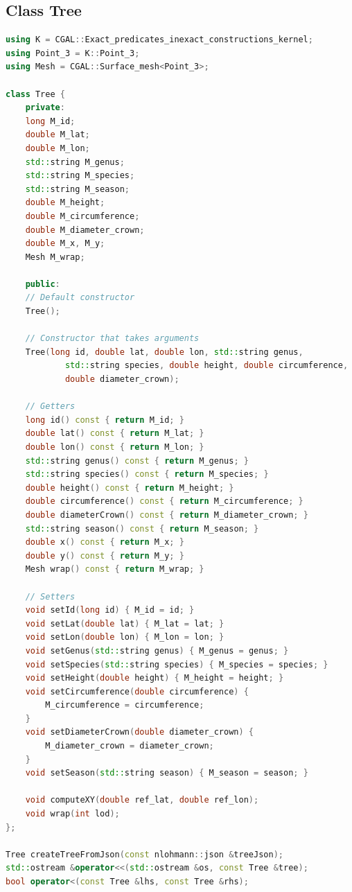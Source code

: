 \documentclass[12pt]{article}
\begin{document}
\subsection{Class Tree}
\begin{lstlisting}[language=C++]
using K = CGAL::Exact_predicates_inexact_constructions_kernel;
using Point_3 = K::Point_3;
using Mesh = CGAL::Surface_mesh<Point_3>;

class Tree {
    private:
    long M_id;
    double M_lat;
    double M_lon;
    std::string M_genus;
    std::string M_species;
    std::string M_season;
    double M_height;
    double M_circumference;
    double M_diameter_crown;
    double M_x, M_y;
    Mesh M_wrap;

    public:
    // Default constructor
    Tree();

    // Constructor that takes arguments
    Tree(long id, double lat, double lon, std::string genus,
            std::string species, double height, double circumference,
            double diameter_crown);

    // Getters
    long id() const { return M_id; }
    double lat() const { return M_lat; }
    double lon() const { return M_lon; }
    std::string genus() const { return M_genus; }
    std::string species() const { return M_species; }
    double height() const { return M_height; }
    double circumference() const { return M_circumference; }
    double diameterCrown() const { return M_diameter_crown; }
    std::string season() const { return M_season; }
    double x() const { return M_x; }
    double y() const { return M_y; }
    Mesh wrap() const { return M_wrap; }

    // Setters
    void setId(long id) { M_id = id; }
    void setLat(double lat) { M_lat = lat; }
    void setLon(double lon) { M_lon = lon; }
    void setGenus(std::string genus) { M_genus = genus; }
    void setSpecies(std::string species) { M_species = species; }
    void setHeight(double height) { M_height = height; }
    void setCircumference(double circumference) {
        M_circumference = circumference;
    }
    void setDiameterCrown(double diameter_crown) {
        M_diameter_crown = diameter_crown;
    }
    void setSeason(std::string season) { M_season = season; }

    void computeXY(double ref_lat, double ref_lon);
    void wrap(int lod);
};

Tree createTreeFromJson(const nlohmann::json &treeJson);
std::ostream &operator<<(std::ostream &os, const Tree &tree);
bool operator<(const Tree &lhs, const Tree &rhs);
\end{lstlisting}
\end{document}

